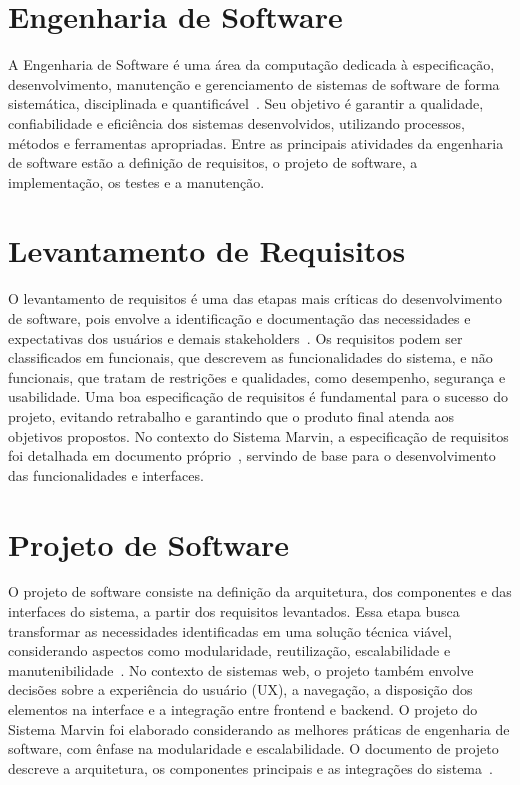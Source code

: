 \section{Engenharia de Software}
\label{sec-fundteo-engsoft}

A Engenharia de Software é uma área da computação dedicada à especificação, desenvolvimento, manutenção e gerenciamento de sistemas de software de forma sistemática, disciplinada e quantificável~\cite{pressman2016engenharia}. Seu objetivo é garantir a qualidade, confiabilidade e eficiência dos sistemas desenvolvidos, utilizando processos, métodos e ferramentas apropriadas. Entre as principais atividades da engenharia de software estão a definição de requisitos, o projeto de software, a implementação, os testes e a manutenção.

\section{Levantamento de Requisitos}
\label{sec-fundteo-requisitos}

O levantamento de requisitos é uma das etapas mais críticas do desenvolvimento de software, pois envolve a identificação e documentação das necessidades e expectativas dos usuários e demais stakeholders~\cite{sommerville2011software}. Os requisitos podem ser classificados em funcionais, que descrevem as funcionalidades do sistema, e não funcionais, que tratam de restrições e qualidades, como desempenho, segurança e usabilidade. Uma boa especificação de requisitos é fundamental para o sucesso do projeto, evitando retrabalho e garantindo que o produto final atenda aos objetivos propostos. No contexto do Sistema Marvin, a especificação de requisitos foi detalhada em documento próprio~\cite{requisitos_marvin_core}, servindo de base para o desenvolvimento das funcionalidades e interfaces.

\section{Projeto de Software}
\label{sec-fundteo-projeto}

O projeto de software consiste na definição da arquitetura, dos componentes e das interfaces do sistema, a partir dos requisitos levantados. Essa etapa busca transformar as necessidades identificadas em uma solução técnica viável, considerando aspectos como modularidade, reutilização, escalabilidade e manutenibilidade~\cite{pressman2016engenharia}. No contexto de sistemas web, o projeto também envolve decisões sobre a experiência do usuário (UX), a navegação, a disposição dos elementos na interface e a integração entre frontend e backend. O projeto do Sistema Marvin foi elaborado considerando as melhores práticas de engenharia de software, com ênfase na modularidade e escalabilidade. O documento de projeto descreve a arquitetura, os componentes principais e as integrações do sistema~\cite{projeto_marvin_core}.

